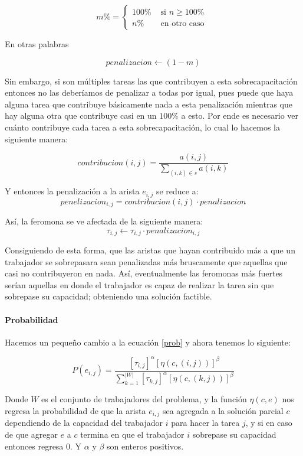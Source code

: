 \documentclass{article}
\begin{document}
    \[ m \% = \begin{cases}
          100 \% & \text{ si } n \geq 100 \% \\
          n \%   & \text{ en otro caso }
       \end{cases}
    \]

    En otras palabras 
    
    \[ penalizacion \leftarrow (1 - m) \]

    Sin embargo, si son múltiples tareas las que contribuyen a 
    esta sobrecapacitación entonces no las deberíamos de penalizar
    a todas por igual, pues puede que haya alguna tarea que 
    contribuye básicamente nada a esta penalización mientras que 
    hay alguna otra que contribuye casi en un $100 \%$ a esto.
    Por ende es necesario ver cuánto contribuye cada tarea a 
    esta sobrecapacitación, lo cual lo hacemos la siguiente manera:

    \[ contribucion(i, j) = \frac{ a(i, j) } { \sum_{(i, k) \in s} a(i, k) } \]

    Y entonces la penalización a la arista $e_{i, j}$ se reduce a:
    \[ penelizacion_{i, j} = contribucion(i, j) \cdot penalizacion \]

    Así, la feromona se ve afectada de la siguiente manera:
    \[ \tau_{i, j} \leftarrow \tau_{i, j} \cdot penalizacion_{i, j} \]

    Consiguiendo de esta forma, que las aristas que hayan contribuido
    más a que un trabajador se sobrepasara sean penalizadas más bruscamente
    que aquellas que casi no contribuyeron en nada. Así, eventualmente
    las feromonas más fuertes serían aquellas en donde el trabajador es 
    capaz de realizar la tarea sin que sobrepase su capacidad; obteniendo 
    una solución factible.

    \paragraph{Probabilidad} Hacemos un pequeño cambio a la ecuación 
    \ref{prob} y ahora tenemos lo siguiente:

    \begin{equation} \label{n_update}
            P(e_{i, j}) = 
              \frac{ [\tau_{i,j}]^{\alpha} [\eta(c, (i, j))]^{\beta} } 
                   { \sum_{k = 1}^{|W|} [\tau_{k,j}]^{\alpha} [\eta(c, (k, j))]^{\beta} }
    \end{equation}

    Donde $W$ es el conjunto de trabajadores del problema, y la función
    $\eta(c, e)$ nos regresa la probabilidad de que la arista $e_{i, j}$
    sea agregada a la solución parcial $c$ dependiendo de la capacidad 
    del trabajador $i$ para hacer la tarea $j$, y si en caso de que agregar
    $e$ a $c$ termina en que el trabajador $i$ sobrepase su capacidad 
    entonces regresa 0. Y $\alpha$ y $\beta$ son enteros positivos.
\end{document}
